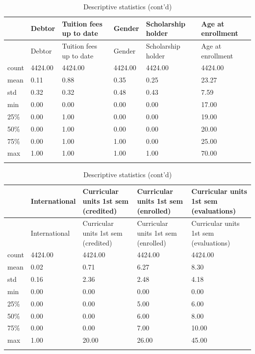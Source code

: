\documentclass[
  letterpaper,
  DIV=11,
  numbers=noendperiod]{scrartcl}
\begin{document}
\hypertarget{tab-descstat-4}{}
\begin{longtable}[]{@{}llllll@{}}
\toprule\noalign{}
& Debtor & Tuition fees up to date & Gender & Scholarship holder & Age
at enrollment \\
\midrule\noalign{}
\endfirsthead
\toprule\noalign{}
& Debtor & Tuition fees up to date & Gender & Scholarship holder & Age
at enrollment \\
\midrule\noalign{}
\endhead
\bottomrule\noalign{}
\endlastfoot
count & 4424.00 & 4424.00 & 4424.00 & 4424.00 & 4424.00 \\
mean & 0.11 & 0.88 & 0.35 & 0.25 & 23.27 \\
std & 0.32 & 0.32 & 0.48 & 0.43 & 7.59 \\
min & 0.00 & 0.00 & 0.00 & 0.00 & 17.00 \\
25\% & 0.00 & 1.00 & 0.00 & 0.00 & 19.00 \\
50\% & 0.00 & 1.00 & 0.00 & 0.00 & 20.00 \\
75\% & 0.00 & 1.00 & 1.00 & 0.00 & 25.00 \\
max & 1.00 & 1.00 & 1.00 & 1.00 & 70.00 \\
\caption{Descriptive statistics (cont'd) }\tabularnewline
\end{longtable}

\hypertarget{tab-descstat-5}{}
\begin{longtable}[]{@{}lllll@{}}
\toprule\noalign{}
& International & Curricular units 1st sem (credited) & Curricular units
1st sem (enrolled) & Curricular units 1st sem (evaluations) \\
\midrule\noalign{}
\endfirsthead
\toprule\noalign{}
& International & Curricular units 1st sem (credited) & Curricular units
1st sem (enrolled) & Curricular units 1st sem (evaluations) \\
\midrule\noalign{}
\endhead
\bottomrule\noalign{}
\endlastfoot
count & 4424.00 & 4424.00 & 4424.00 & 4424.00 \\
mean & 0.02 & 0.71 & 6.27 & 8.30 \\
std & 0.16 & 2.36 & 2.48 & 4.18 \\
min & 0.00 & 0.00 & 0.00 & 0.00 \\
25\% & 0.00 & 0.00 & 5.00 & 6.00 \\
50\% & 0.00 & 0.00 & 6.00 & 8.00 \\
75\% & 0.00 & 0.00 & 7.00 & 10.00 \\
max & 1.00 & 20.00 & 26.00 & 45.00 \\
\caption{Descriptive statistics (cont'd) }\tabularnewline
\end{longtable}
\end{document}
